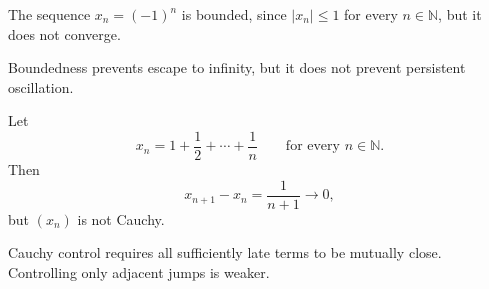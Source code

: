 \begin{example}
\label{ex:sequence-counterexample-bounded-not-convergent}
The sequence $x_n=(-1)^n$ is bounded, since $|x_n|\le 1$ for every
$n\in\mathbb{N}$, but it does not converge.
\end{example}

\begin{remark*}[Interpretation]
Boundedness prevents escape to infinity, but it does not prevent persistent
oscillation.
\end{remark*}

\begin{example}
\label{ex:sequence-counterexample-successive-differences-not-cauchy}
Let
\[
  x_n=1+\frac{1}{2}+\cdots+\frac{1}{n}
  \qquad
  \text{for every } n\in\mathbb{N}.
\]
Then
\[
  x_{n+1}-x_n=\frac{1}{n+1}\to 0,
\]
but $(x_n)$ is not Cauchy.
\end{example}

\begin{remark*}[Interpretation]
Cauchy control requires all sufficiently late terms to be mutually close.
Controlling only adjacent jumps is weaker.
\end{remark*}